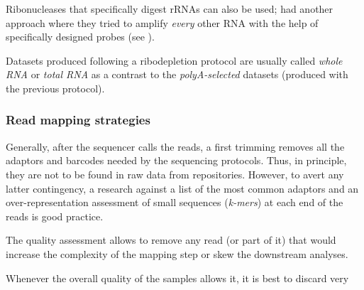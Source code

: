 Ribonucleases that specifically digest \glspl{rRNA} can also be used;
\cite{castleData} had another approach where they tried to amplify \emph{every}
other \gls{RNA} with the help of specifically designed probes (see
).

Datasets produced following a ribodepletion protocol are usually called
\emph{whole \gls{RNA}} or \emph{total \gls{RNA}} as a contrast to the
\emph{polyA-selected} datasets (produced with the previous protocol).

\clearpage












\subsubsection{Read mapping strategies}


\NB Generally, after the sequencer calls the reads, a first trimming removes
all the adaptors and barcodes needed by the sequencing protocols. Thus,
in principle, they are not to be found in raw data from repositories.
However, to avert any latter contingency, a research against
a list of the most common adaptors and an over-representation assessment of small
sequences (\emph{k-mers}) at each end of the reads is good practice.







The quality assessment allows to remove any read (or part of it) that would
increase the complexity of the mapping step or skew the downstream analyses.

Whenever the overall quality of the samples allows it, it is best to discard very


